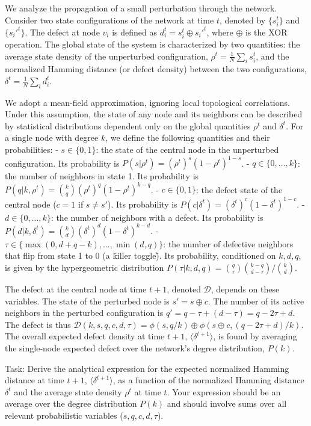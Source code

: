 \documentclass[10pt]{article}
\begin{document}
We analyze the propagation of a small perturbation through the network. Consider two state configurations of the network at time $t$, denoted by $\{s_i^t\}$ and $\{s_i'^t\}$. The defect at node $v_i$ is defined as $d_i^t = s_i^t \oplus s_i'^t$, where $\oplus$ is the XOR operation. The global state of the system is characterized by two quantities: the average state density of the unperturbed configuration, $\rho^t = \frac{1}{N}\sum_i s_i^t$, and the normalized Hamming distance (or defect density) between the two configurations, $\delta^t = \frac{1}{N}\sum_i d_i^t$.

We adopt a mean-field approximation, ignoring local topological correlations. Under this assumption, the state of any node and its neighbors can be described by statistical distributions dependent only on the global quantities $\rho^t$ and $\delta^t$. For a single node with degree $k$, we define the following quantities and their probabilities:
- $s \in \{0,1\}$: the state of the central node in the unperturbed configuration. Its probability is $P(s|\rho^t) = (\rho^t)^s (1-\rho^t)^{1-s}$.
- $q \in \{0, \dots, k\}$: the number of neighbors in state 1. Its probability is $P(q|k,\rho^t) = \binom{k}{q} (\rho^t)^q (1-\rho^t)^{k-q}$.
- $c \in \{0,1\}$: the defect state of the central node ($c=1$ if $s \neq s'$). Its probability is $P(c|\delta^t) = (\delta^t)^c (1-\delta^t)^{1-c}$.
- $d \in \{0, \dots, k\}$: the number of neighbors with a defect. Its probability is $P(d|k,\delta^t) = \binom{k}{d}(\delta^t)^d (1-\delta^t)^{k-d}$.
- $\tau \in \{\max(0, d+q-k), \dots, \min(d,q)\}$: the number of defective neighbors that flip from state 1 to 0 (a \"killer toggle\"). Its probability, conditioned on $k, d, q$, is given by the hypergeometric distribution $P(\tau|k, d, q) = \binom{q}{\tau}\binom{k-q}{d-\tau} / \binom{k}{d}$.

The defect at the central node at time $t+1$, denoted $\mathcal{D}$, depends on these variables. The state of the perturbed node is $s' = s \oplus c$. The number of its active neighbors in the perturbed configuration is $q' = q - \tau + (d-\tau) = q - 2\tau + d$. The defect is thus $\mathcal{D}(k, s, q, c, d, \tau) = \phi(s, q/k) \oplus \phi(s\oplus c, (q-2\tau+d)/k)$. The overall expected defect density at time $t+1$, $\langle\delta^{t+1}\rangle$, is found by averaging the single-node expected defect over the network's degree distribution, $P(k)$.

Task:
Derive the analytical expression for the expected normalized Hamming distance at time $t+1$, $\langle\delta^{t+1}\rangle$, as a function of the normalized Hamming distance $\delta^t$ and the average state density $\rho^t$ at time $t$. Your expression should be an average over the degree distribution $P(k)$ and should involve sums over all relevant probabilistic variables ($s, q, c, d, \tau$).
\end{document}
